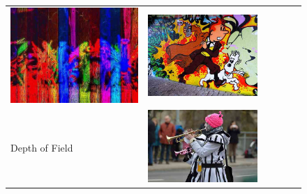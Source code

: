 \begin{figure}
\begin{minipage}[t]{\textwidth}
\begin{tabular}{m{.01\linewidth} m{.16\linewidth} m{.16\linewidth} m{.16\linewidth} m{.16\linewidth} m{.16\linewidth}}
    \includegraphics[width=\linewidth]{../style/figures/flickr_on_flickr/pred_style_Bright/3.jpg} &
    \includegraphics[width=\linewidth]{../style/figures/flickr_on_flickr/pred_style_Bright/4.jpg} \\
    \begin{turn}{90}\small{Depth of Field}\end{turn} &
    \includegraphics[width=\linewidth]{../style/figures/flickr_on_flickr/pred_style_Depth_of_Field/0.jpg} &

\end{tabular}
\end{minipage}
\end{figure}
